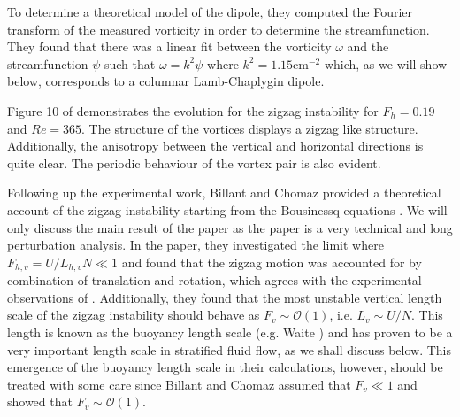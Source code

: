To determine a theoretical model of the dipole, they computed the Fourier transform of the measured vorticity in order to determine the streamfunction. They found that there was a linear fit between the vorticity $\omega$ and the streamfunction $\psi$ such that $\omega = k^{2}\psi$ where $k^{2}=1.15 \text{cm}^{-2}$  which, as we will show below, corresponds to a columnar Lamb-Chaplygin dipole.

Figure 10 of \cite{bc2000a} demonstrates the evolution for the zigzag instability for $F_{h}=0.19$ and $Re=365$. The structure of the vortices displays a zigzag like structure. Additionally, the anisotropy between the vertical and horizontal directions is quite clear. The periodic behaviour of the vortex pair is also evident. 



Following up the experimental work, Billant and Chomaz provided a theoretical account of the zigzag instability starting from the Bousinessq equations \cite{bc2000b}. We will only discuss the main result of the paper as the paper is a very technical and long perturbation analysis. In the paper, they investigated the limit where $F_{h,v} = U/L_{h,v}N \ll 1$ and found that the zigzag motion was accounted for by combination of translation and rotation, which agrees with the experimental observations of \cite{bc2000a}. Additionally, they found that the most unstable vertical length scale of the zigzag instability should behave as $F_{v} \sim \mathcal{O}(1)$, i.e. $L_{v} \sim U/N$. This length is known as the buoyancy length scale (e.g. Waite \cite{waite2011}) and has proven to be a very important length scale in stratified fluid flow, as we shall discuss below. This emergence of the buoyancy length scale in their calculations, however,  should be treated with some care since Billant and Chomaz assumed that $F_{v}\ll 1$ and showed that $F_{v}\sim \mathcal{O}(1)$. 

